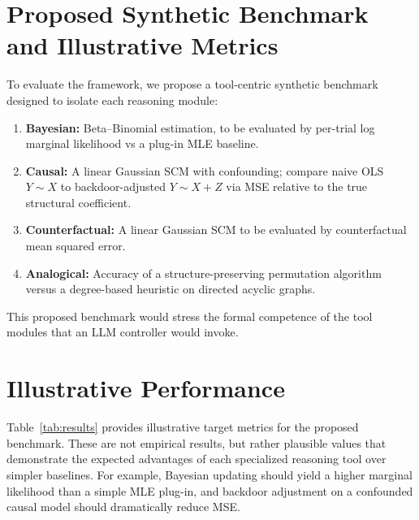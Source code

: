 \documentclass[11pt]{article}
\begin{document}
\section{Proposed Synthetic Benchmark and Illustrative Metrics}
To evaluate the framework, we propose a tool-centric synthetic benchmark designed to isolate each reasoning module:
\begin{enumerate}
\item \textbf{Bayesian:} Beta--Binomial estimation, to be evaluated by per-trial log marginal likelihood vs a plug-in MLE baseline.
\item \textbf{Causal:} A linear Gaussian SCM with confounding; compare naive OLS $Y\!\sim\!X$ to backdoor-adjusted $Y\!\sim\!X{+}Z$ via MSE relative to the true structural coefficient.
\item \textbf{Counterfactual:} A linear Gaussian SCM to be evaluated by counterfactual mean squared error.
\item \textbf{Analogical:} Accuracy of a structure-preserving permutation algorithm versus a degree-based heuristic on directed acyclic graphs.
\end{enumerate}
This proposed benchmark would stress the formal competence of the tool modules that an LLM controller would invoke.

\section{Illustrative Performance}
Table~\ref{tab:results} provides illustrative target metrics for the proposed benchmark. These are not empirical results, but rather plausible values that demonstrate the expected advantages of each specialized reasoning tool over simpler baselines. For example, Bayesian updating should yield a higher marginal likelihood than a simple MLE plug-in, and backdoor adjustment on a confounded causal model should dramatically reduce MSE.
\end{document}
